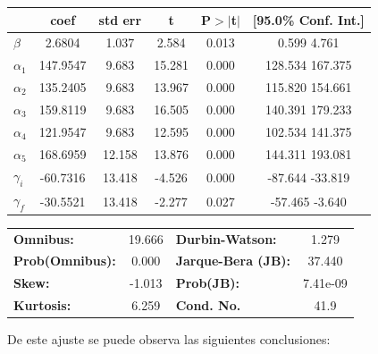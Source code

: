 \documentclass{article}
\begin{document}
\begin {table}
\begin{center}
\begin{tabular}{lccccc}
            & \textbf{coef} & \textbf{std err} & \textbf{t} & \textbf{P$>|$t$|$} & \textbf{[95.0\% Conf. Int.]}  \\
\midrule
\textbf{$\beta$} &       2.6804  &        1.037     &     2.584  &         0.013        &         0.599     4.761       \\
\textbf{$\alpha_1$} &     147.9547  &        9.683     &    15.281  &         0.000        &       128.534   167.375       \\
\textbf{$\alpha_2$} &     135.2405  &        9.683     &    13.967  &         0.000        &       115.820   154.661       \\
\textbf{$\alpha_3$} &     159.8119  &        9.683     &    16.505  &         0.000        &       140.391   179.233       \\
\textbf{$\alpha_4$} &     121.9547  &        9.683     &    12.595  &         0.000        &       102.534   141.375       \\
\textbf{$\alpha_5$} &     168.6959  &       12.158     &    13.876  &         0.000        &       144.311   193.081       \\
\textbf{$\gamma_i$} &     -60.7316  &       13.418     &    -4.526  &         0.000        &       -87.644   -33.819       \\
\textbf{$\gamma_f$} &     -30.5521  &       13.418     &    -2.277  &         0.027        &       -57.465    -3.640       \\
\bottomrule
\end{tabular}

\begin{tabular}{lclc}
\textbf{Omnibus:}       & 19.666 & \textbf{  Durbin-Watson:     } &    1.279  \\
\textbf{Prob(Omnibus):} &  0.000 & \textbf{  Jarque-Bera (JB):  } &   37.440  \\
\textbf{Skew:}          & -1.013 & \textbf{  Prob(JB):          } & 7.41e-09  \\
\textbf{Kurtosis:}      &  6.259 & \textbf{  Cond. No.          } &     41.9  \\
\bottomrule
\end{tabular}
\end{center}

\end{table}

De este ajuste se puede observa las siguientes conclusiones:
\end{document}

